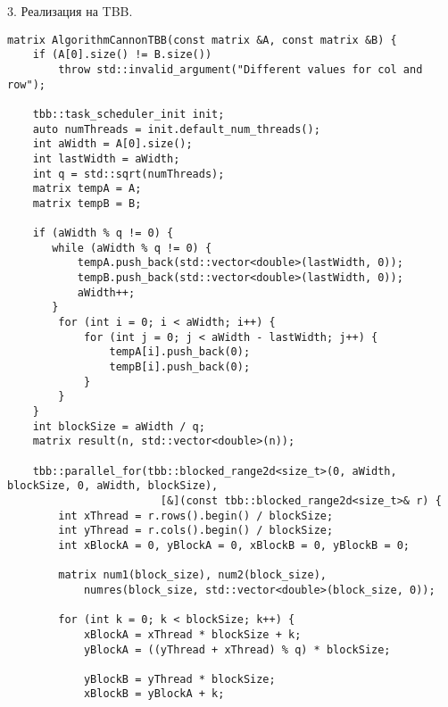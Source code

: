 \documentclass{report}
\begin{document}
\par 3. Реализация на TBB.
\begin{lstlisting}
matrix AlgorithmCannonTBB(const matrix &A, const matrix &B) {
    if (A[0].size() != B.size())
        throw std::invalid_argument("Different values for col and row");

    tbb::task_scheduler_init init;
    auto numThreads = init.default_num_threads();
    int aWidth = A[0].size();
    int lastWidth = aWidth;
    int q = std::sqrt(numThreads);
    matrix tempA = A;
    matrix tempB = B;

    if (aWidth % q != 0) {
       while (aWidth % q != 0) {
           tempA.push_back(std::vector<double>(lastWidth, 0));
           tempB.push_back(std::vector<double>(lastWidth, 0));
           aWidth++;
       }
        for (int i = 0; i < aWidth; i++) {
            for (int j = 0; j < aWidth - lastWidth; j++) {
                tempA[i].push_back(0);
                tempB[i].push_back(0);
            }
        }
    }
    int blockSize = aWidth / q;
    matrix result(n, std::vector<double>(n));

    tbb::parallel_for(tbb::blocked_range2d<size_t>(0, aWidth, blockSize, 0, aWidth, blockSize),
                        [&](const tbb::blocked_range2d<size_t>& r) {
        int xThread = r.rows().begin() / blockSize;
        int yThread = r.cols().begin() / blockSize;
        int xBlockA = 0, yBlockA = 0, xBlockB = 0, yBlockB = 0;

        matrix num1(block_size), num2(block_size),
            numres(block_size, std::vector<double>(block_size, 0));

        for (int k = 0; k < blockSize; k++) {
            xBlockA = xThread * blockSize + k;
            yBlockA = ((yThread + xThread) % q) * blockSize;

            yBlockB = yThread * blockSize;
            xBlockB = yBlockA + k;


\end{lstlisting}
\end{document}
